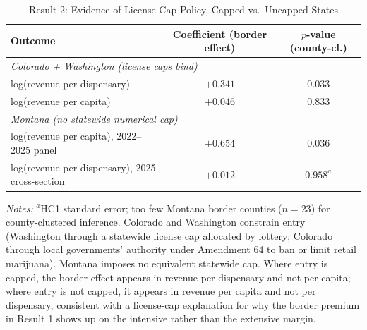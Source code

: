 \begin{table}[htbp]
\centering
\caption{Result 2: Evidence of License-Cap Policy, Capped vs.\ Uncapped States}
\label{tab:result2}
\small
\begin{tabular}{lcc}
\toprule
Outcome & Coefficient (border effect) & $p$-value (county-cl.) \\
\midrule
\multicolumn{3}{l}{\textit{Colorado + Washington (license caps bind)}} \\
log(revenue per dispensary) & $+0.341$ & $0.033$ \\
log(revenue per capita) & $+0.046$ & $0.833$ \\
\midrule
\multicolumn{3}{l}{\textit{Montana (no statewide numerical cap)}} \\
log(revenue per capita), 2022--2025 panel & $+0.654$ & $0.036$ \\
log(revenue per dispensary), 2025 cross-section & $+0.012$ & $0.958^{a}$ \\
\bottomrule
\end{tabular}
\begin{minipage}{0.95\textwidth}
\vspace{0.3em}
\footnotesize
\textit{Notes:} $^{a}$HC1 standard error; too few Montana border counties ($n=23$) for county-clustered
inference. Colorado and Washington constrain entry (Washington through a statewide license cap allocated by
lottery; Colorado through local governments' authority under Amendment 64 to ban or limit retail marijuana).
Montana imposes no equivalent statewide cap. Where entry is capped, the border effect appears in revenue per
dispensary and not per capita; where entry is not capped, it appears in revenue per capita and not per
dispensary, consistent with a license-cap explanation for why the border premium in Result 1 shows up on the
intensive rather than the extensive margin.
\end{minipage}
\end{table}
